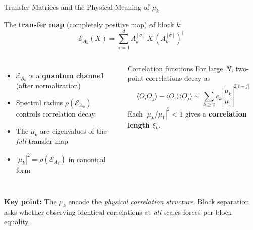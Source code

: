 \documentclass[aspectratio=169,10pt]{beamer}
\begin{document}
\begin{frame}{Transfer Matrices and the Physical Meaning of $\mu_k$}
\vspace{-0.5em}

The \textbf{transfer map} (completely positive map) of block $k$:
\[
  \mathcal{E}_{A_k}(X)
  = 
  \sum_{\sigma=1}^{d} A_k^{[\sigma]}\, X\, (A_k^{[\sigma]})^{\!\dagger}
\]

\vspace{-0.3em}
\begin{columns}[T]
\begin{itemize}
  \item $\mathcal{E}_{A_k}$ is a \textbf{quantum channel} (after normalization)
  \item Spectral radius $\rho(\mathcal{E}_{A_k})$ controls correlation decay
  \item The $\mu_k$ are eigenvalues of the \emph{full} transfer map
  \item $|\mu_k|^2 = \rho(\mathcal{E}_{A_k})$ in canonical form \cite{Cirac2021Matrix}
\end{itemize}

\begin{block}{\small Correlation functions}
{\small
For large $N$, two-point correlations decay as
\[
  \langle O_i O_j \rangle - \langle O_i\rangle\langle O_j\rangle
  \sim 
  \sum_{k\ge 2} c_k \left|\frac{\mu_k}{\mu_1}\right|^{2|i-j|}
\]
Each $|\mu_k/\mu_1|^2 < 1$ gives a \textbf{correlation length} $\xi_k$.
}
\end{block}
\end{columns}

\vspace{0.5em}
\textcolor{amber}{\textbf{Key point:}} The $\mu_k$ encode the \emph{physical correlation structure}.
Block separation asks whether observing identical correlations at \emph{all} scales forces
per-block equality.
\end{frame}
\end{document}

